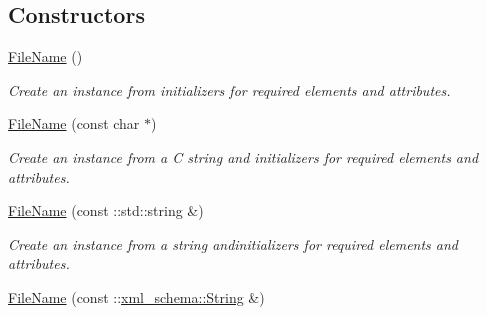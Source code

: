 \subsection*{Constructors}
\begin{DoxyCompactItemize}
\item 
\hypertarget{classopenstack_1_1xml_1_1FileName_a813024b93635d9edd7b84f6844bea8b1}{
\hyperlink{classopenstack_1_1xml_1_1FileName_a813024b93635d9edd7b84f6844bea8b1}{FileName} ()}
\label{classopenstack_1_1xml_1_1FileName_a813024b93635d9edd7b84f6844bea8b1}

\begin{DoxyCompactList}\small\item\em Create an instance from initializers for required elements and attributes. \item\end{DoxyCompactList}\item 
\hypertarget{classopenstack_1_1xml_1_1FileName_a0ae2bb1869a6a2c816e1f9afd3dbc36b}{
\hyperlink{classopenstack_1_1xml_1_1FileName_a0ae2bb1869a6a2c816e1f9afd3dbc36b}{FileName} (const char $\ast$)}
\label{classopenstack_1_1xml_1_1FileName_a0ae2bb1869a6a2c816e1f9afd3dbc36b}

\begin{DoxyCompactList}\small\item\em Create an instance from a C string and initializers for required elements and attributes. \item\end{DoxyCompactList}\item 
\hypertarget{classopenstack_1_1xml_1_1FileName_ab179b51b13ef62b3870367c1cea102ff}{
\hyperlink{classopenstack_1_1xml_1_1FileName_ab179b51b13ef62b3870367c1cea102ff}{FileName} (const ::std::string \&)}
\label{classopenstack_1_1xml_1_1FileName_ab179b51b13ef62b3870367c1cea102ff}

\begin{DoxyCompactList}\small\item\em Create an instance from a string andinitializers for required elements and attributes. \item\end{DoxyCompactList}\item 
\hypertarget{classopenstack_1_1xml_1_1FileName_ac0e848d43e3bd8b5d605ca10b4420670}{
\hyperlink{classopenstack_1_1xml_1_1FileName_ac0e848d43e3bd8b5d605ca10b4420670}{FileName} (const ::\hyperlink{namespacexml__schema_af6757b5701ccc893f3b551bd70e0c94d}{xml\_\-schema::String} \&)}
\label{classopenstack_1_1xml_1_1FileName_ac0e848d43e3bd8b5d605ca10b4420670}


\end{DoxyCompactItemize}
